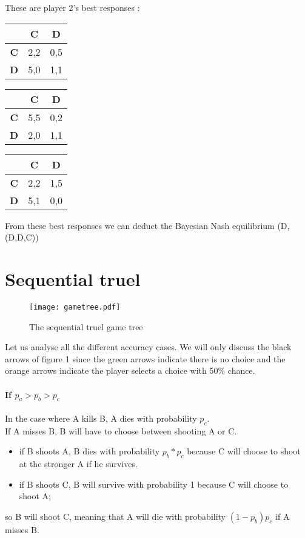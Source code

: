 \documentclass[a4paper]{article}
\begin{document}
These are player 2's best responses :\\
\begin{table}[H]
\begin{tabular}{c|c|c|}
	& \textbf{C} & \textbf{D}\\
	\hline
	\textbf{C} & 2,2 & \cellcolor{red!25} 0,5 \\
	\hline
	\textbf{D} & 5,0 & \cellcolor{red!25} 1,1 \\
\end{tabular}
\hfill
\begin{tabular}{c|c|c|}
	& \textbf{C} & \textbf{D}\\
	\hline
	\textbf{C} & \cellcolor{red!25} 5,5 & 0,2 \\
	\hline
	\textbf{D} & 2,0 & \cellcolor{red!25} 1,1 \\
\end{tabular}
\hfill
\begin{tabular}{c|c|c|}
	& \textbf{C} & \textbf{D}\\
	\hline
	\textbf{C} & 2,2 & \cellcolor{red!25} 1,5 \\
	\hline
	\textbf{D} & \cellcolor{red!25} 5,1 & 0,0 \\
\end{tabular}
\end{table}

From these best responses we can deduct the Bayesian Nash equilibrium
(D,(D,D,C))

\section{Sequential truel}
\begin{figure}
	\texttt{[image: gametree.pdf]}
	\caption{The sequential truel game tree}
\end{figure}

Let us analyse all the different accuracy cases. We will only discuss the black
arrows of figure 1 since the green arrows indicate there is no choice and the
orange arrows indicate the player selects a choice with 50\% chance.

\paragraph{If $p_a > p_b > p_c$} In the case where A kills B, A dies with
probability $p_c$.\\

If A misses B, B will have to choose between shooting A or C.
\begin{itemize}
	\item if B shoots A, B dies with probability $p_b*p_c$ because C will
		choose to shoot at the stronger A if he survives.
	\item if B shoots C, B will survive with probability 1 because C will
		choose to shoot A;
\end{itemize}
so B will shoot C, meaning that A will die with probability $(1-p_b)p_c$ if A
misses B.\\
\end{document}
